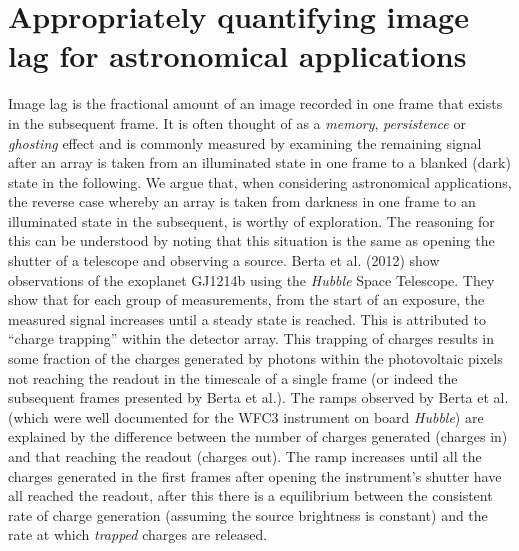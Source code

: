 \documentclass{spie}
\begin{document}
\section{Appropriately quantifying image lag for astronomical applications}\label{sec:lag}
Image lag is the fractional amount of an image recorded in one frame that exists in the subsequent frame. It is often thought of as a \textit{memory}, \textit{persistence} or \textit{ghosting} effect and is commonly measured by examining the remaining signal after an array is taken from an illuminated state in one frame to a blanked (dark) state in the following. We argue that, when considering astronomical applications, the reverse case whereby an array is taken from darkness in one frame to an illuminated state in the subsequent, is worthy of exploration. The reasoning for this can be understood by noting that this situation is the same as opening the shutter of a telescope and observing a source. Berta et al. (2012)\cite{Berta2012} show observations of the exoplanet GJ1214b using the \textit{Hubble} Space Telescope. They show that for each group of measurements, from the start of an exposure, the measured signal increases until a steady state is reached. This is attributed to ``charge trapping'' within the detector array. This trapping of charges results in some fraction of the charges generated by photons within the photovoltaic pixels not reaching the readout in the timescale of a single frame (or indeed the subsequent frames presented by Berta et al.). The ramps observed by Berta et al. (which were well documented for the WFC3 instrument on board \textit{Hubble}) are explained by the difference between the number of charges generated (charges in) and that reaching the readout (charges out). The ramp increases until all the charges generated in the first frames after opening the instrument's shutter have all reached the readout, after this there is a equilibrium between the consistent rate of charge generation (assuming the source brightness is constant) and the rate at which \textit{trapped} charges are released.
\end{document}
